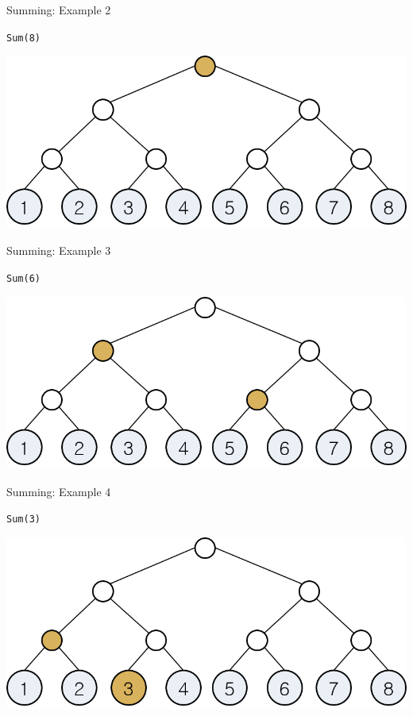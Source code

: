 \documentclass[13pt,onlymath]{beamer}
\begin{document}
\begin{frame}[fragile]{Summing: Example 2}
\BIT
\item \verb,Sum(8),
\EIT
\begin{center}
\includegraphics[height=0.4\textheight]{figures/fenwick_sum2}
\end{center}
\end{frame}

\begin{frame}[fragile]{Summing: Example 3}
\BIT
\item \verb,Sum(6),
\EIT
\begin{center}
\includegraphics[height=0.4\textheight]{figures/fenwick_sum3}
\end{center}
\end{frame}

\begin{frame}[fragile]{Summing: Example 4}
\BIT
\item \verb,Sum(3),
\EIT
\begin{center}
\includegraphics[height=0.4\textheight]{figures/fenwick_sum4}
\end{center}
\end{frame}
\end{document}
